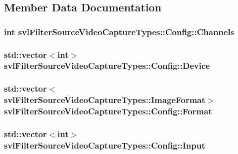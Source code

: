 \subsection{Member Data Documentation}
\hypertarget{classsvl_filter_source_video_capture_types_1_1_config_ab67c9d24dd0a3390c9614b72481953cb}{
\subsubsection[{Channels}]{\setlength{\rightskip}{0pt plus 5cm}int svl\-Filter\-Source\-Video\-Capture\-Types\-::\-Config\-::\-Channels}}\label{classsvl_filter_source_video_capture_types_1_1_config_ab67c9d24dd0a3390c9614b72481953cb}
\hypertarget{classsvl_filter_source_video_capture_types_1_1_config_aff510fed99ea18174cdec30429959e10}{
\subsubsection[{Device}]{\setlength{\rightskip}{0pt plus 5cm}std\-::vector$<$int$>$ svl\-Filter\-Source\-Video\-Capture\-Types\-::\-Config\-::\-Device}}\label{classsvl_filter_source_video_capture_types_1_1_config_aff510fed99ea18174cdec30429959e10}
\hypertarget{classsvl_filter_source_video_capture_types_1_1_config_a2bc1136b3413c972728318093224f6f0}{
\subsubsection[{Format}]{\setlength{\rightskip}{0pt plus 5cm}std\-::vector$<${\bf svl\-Filter\-Source\-Video\-Capture\-Types\-::\-Image\-Format}$>$ svl\-Filter\-Source\-Video\-Capture\-Types\-::\-Config\-::\-Format}}\label{classsvl_filter_source_video_capture_types_1_1_config_a2bc1136b3413c972728318093224f6f0}
\hypertarget{classsvl_filter_source_video_capture_types_1_1_config_aaf5c493c57a549108677f3b83d75f2cd}{
\subsubsection[{Input}]{\setlength{\rightskip}{0pt plus 5cm}std\-::vector$<$int$>$ svl\-Filter\-Source\-Video\-Capture\-Types\-::\-Config\-::\-Input}}\label{classsvl_filter_source_video_capture_types_1_1_config_aaf5c493c57a549108677f3b83d75f2cd}
